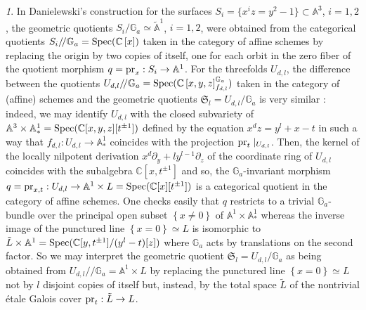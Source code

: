 \documentclass[10pt,oneside,english]{amsart}
\numberwithin{equation}{section}
\numberwithin{figure}{section}
\theoremstyle{plain}
\theoremstyle{remark}
\newtheorem{rem}[thm]{\protect\remarkname}
\theoremstyle{plain}
\theoremstyle{plain}
\theoremstyle{definition}
\providecommand{\remarkname}{Remark}
\begin{document}
\begin{rem}
In Danielewski's construction for the surfaces $S_{i}=\{x^{i}z=y^{2}-1\}\subset\mathbb{A}^{3}$,
$i=1,2$, the geometric quotients $S_{i}/\mathbb{G}_{a}\simeq\tilde{\mathbb{A}}^{1}$,
$i=1,2$, were obtained from the categorical quotients $S_{i}/\!/\mathbb{G}_{a}={\rm Spec}(\mathbb{C}\left[x\right])$
taken in the category of affine schemes by replacing the origin by
two copies of itself, one for each orbit in the zero fiber of the
quotient morphism $q={\rm pr}_{x}:S_{i}\rightarrow\mathbb{A}^{1}$.
For the threefolds $U_{d,l}$, the difference between the quotients
$U_{d,l}/\!/\mathbb{G}_{a}={\rm Spec}(\mathbb{C}\left[x,y,z\right]_{f_{d,l}}^{\mathbb{G}_{a}})$
taken in the category of (affine) schemes and the geometric quotients
$\mathfrak{S}_{l}=U_{d,l}/\mathbb{G}_{a}$ is very similar : indeed,
we may identify $U_{d,l}$ with the closed subvariety of $\mathbb{A}^{3}\times\mathbb{A}_{*}^{1}={\rm Spec}(\mathbb{C}[x,y,z][t^{\pm1}])$
defined by the equation $x^{d}z=y^{l}+x-t$ in such a way that $f_{d,l}:U_{d,l}\rightarrow\mathbb{A}_{*}^{1}$
coincides with the projection ${\rm pr}_{t}\mid_{U_{d,l}}$. Then,
the kernel of the locally nilpotent derivation $x^{d}\partial_{y}+ly^{l-1}\partial_{z}$
of the coordinate ring of $U_{d,l}$ coincides with the subalgebra
$\mathbb{C}[x,t^{\pm1}]$ and so, the $\mathbb{G}_{a}$-invariant
morphism $q={\rm pr}_{x,t}:U_{d,l}\rightarrow\mathbb{A}^{1}\times L={\rm Spec}(\mathbb{C}[x][t^{\pm1}])$
is a categorical quotient in the category of affine schemes. One checks
easily that $q$ restricts to a trivial $\mathbb{G}_{a}$-bundle over
the principal open subset $\left\{ x\neq0\right\} $ of $\mathbb{A}^{1}\times\mathbb{A}_{*}^{1}$
whereas the inverse image of the punctured line $\left\{ x=0\right\} \simeq L$
is isomorphic to $\tilde{L}\times\mathbb{A}^{1}={\rm Spec}(\mathbb{C}[y,t^{\pm1}]/(y^{l}-t)[z])$
where $\mathbb{G}_{a}$ acts by translations on the second factor.
So we may interpret the geometric quotient $\mathfrak{S}_{l}=U_{d,l}/\mathbb{G}_{a}$
as being obtained from $U_{d,l}/\!/\mathbb{G}_{a}=\mathbb{A}^{1}\times L$
by replacing the punctured line $\left\{ x=0\right\} \simeq L$ not
by $l$ disjoint copies of itself but, instead, by the total space
$\tilde{L}$ of the nontrivial \'etale Galois cover ${\rm pr}_{t}:\tilde{L}\rightarrow L$.
\end{rem}
\vspace{0.2cm}
\end{document}
